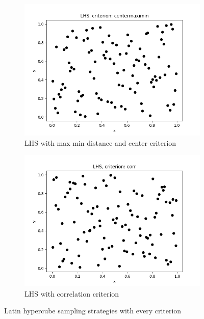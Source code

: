 \begin{figure}[h!]
\begin{subfigure}[b]{0.49\textwidth}
        \includegraphics[width=\textwidth]{resources/images/sampling-lhs-centermaximin.png}
        \caption{LHS with max min distance and center criterion}
        \label{fig:sampling-lhs-centermaximin}
    \end{subfigure} 
    \hfill
    \begin{subfigure}[b]{0.49\textwidth}
        \includegraphics[width=\textwidth]{resources/images/sampling-lhs-corr.png}
        \caption{LHS with correlation criterion}
        \label{fig:sampling-lhs-corr}
    \end{subfigure} 
    \caption{Latin hypercube sampling strategies with every criterion}
\end{figure}

